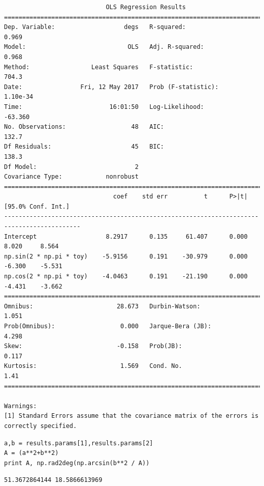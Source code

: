 \documentclass[12pt,fleqn]{article}\usepackage{../../common}
\begin{document}
\begin{verbatim}
                            OLS Regression Results                            
==============================================================================
Dep. Variable:                   degs   R-squared:                       0.969
Model:                            OLS   Adj. R-squared:                  0.968
Method:                 Least Squares   F-statistic:                     704.3
Date:                Fri, 12 May 2017   Prob (F-statistic):           1.10e-34
Time:                        16:01:50   Log-Likelihood:                -63.360
No. Observations:                  48   AIC:                             132.7
Df Residuals:                      45   BIC:                             138.3
Df Model:                           2                                         
Covariance Type:            nonrobust                                         
===========================================================================================
                              coef    std err          t      P>|t|      [95.0% Conf. Int.]
-------------------------------------------------------------------------------------------
Intercept                   8.2917      0.135     61.407      0.000         8.020     8.564
np.sin(2 * np.pi * toy)    -5.9156      0.191    -30.979      0.000        -6.300    -5.531
np.cos(2 * np.pi * toy)    -4.0463      0.191    -21.190      0.000        -4.431    -3.662
==============================================================================
Omnibus:                       28.673   Durbin-Watson:                   1.051
Prob(Omnibus):                  0.000   Jarque-Bera (JB):                4.298
Skew:                          -0.158   Prob(JB):                        0.117
Kurtosis:                       1.569   Cond. No.                         1.41
==============================================================================

Warnings:
[1] Standard Errors assume that the covariance matrix of the errors is correctly specified.
\end{verbatim}

\begin{verbatim}
a,b = results.params[1],results.params[2]
A = (a**2+b**2)
print A, np.rad2deg(np.arcsin(b**2 / A))
\end{verbatim}

\begin{verbatim}
51.3672864144 18.5866613969
\end{verbatim}
\end{document}
